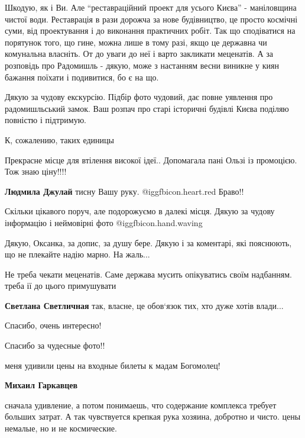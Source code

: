 \begin{itemize}
\begin{itemize}

Шкодую, як і Ви. Але \enquote{реставраційний проект для усього Києва} - маніловщина
чистої води. Реставрація в рази дорожча за нове будівництво, це просто космічні
суми, від проектування і до виконання практичних робіт. Так що сподіватися на
порятунок того, що гине, можна лише в тому разі, якщо це державна чи комунальна
власніть. От до уваги до неї і варто закликати меценатів. А за розповідь про
Радомишль - дякую, може з настанням весни виникне у киян бажання поїхати і
подивитися, бо є на що.

\end{itemize} %


Дякую за чудову екскурсію. Підбір фото чудовий, дає повне уявлення про
радомишльський замок. Ваш розпач про старі історичні будівлі Києва поділяю
повністю і підтримую.

К, сожалению, таких единицы

Прекрасне місце для втілення високої ідеї.. Допомагала пані Ользі із промоцією. Тож знаю ціну!!!!

\textbf{Людмила Джулай} тисну Вашу руку. @igg{fbicon.heart.red} Браво!!


Скільки цікавого поруч, але подорожуємо в далекі місця. Дякую за чудову
інформацію і неймовірні фото  @igg{fbicon.hand.waving} 

Дякую, Оксанка, за допис, за душу бере. Дякую і за коментарі, які пояснюють, що не плекайте надію марно. На жаль...

Не треба чекати меценатів. Саме держава мусить опікуватись своїм надбанням. треба ії до цього примушувати

\textbf{Светлана Светличная} так, власне, це обов‘язок тих, хто дуже хотів влади...

Спасибо, очень интересно!

Спасибо за чудесные фото!!

меня удивили цены на входные билеты к мадам Богомолец!

\begin{itemize} %
\textbf{Михаил Гаркавцев} 

сначала удивление, а потом понимаешь, что содержание комплекса требует больших
затрат. А так чувствуется крепкая рука хозяина, добротно и чисто. цены немалые,
но и не космические.


\end{itemize}
\end{itemize}
